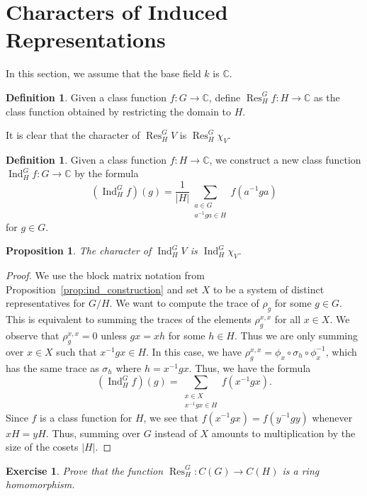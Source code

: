 \documentclass[12pt]{article}
\theoremstyle{plain}
\newtheorem{proposition}[theorem]{Proposition}
\newtheorem{exercise}[theorem]{Exercise}
\theoremstyle{definition}
\newtheorem{definition}[theorem]{Definition}
\theoremstyle{remark}
\numberwithin{equation}{section}
\begin{document}
\section{Characters of Induced Representations}

In this section, we assume that the base field $k$ is $\mathbb{C}$.

\begin{definition}
Given a class function $f : G \to \mathbb{C}$, define
$\operatorname{Res}_H^G f : H \to \mathbb{C}$ as the
class function obtained by restricting the domain to $H$.
\end{definition}

It is clear that the character of $\operatorname{Res}_H^G V$
is $\operatorname{Res}_H^G \chi_V$.

\begin{definition}
Given a class function $f : H \to \mathbb{C}$, we construct a new class
function $\operatorname{Ind}_H^G f : G \to \mathbb{C}$ by the formula
\[
(\operatorname{Ind}_H^G f)(g) =
\frac{1}{|H|}\sum_{\substack{a \in G\\a^{-1}ga \in H}} f(a^{-1}ga)
\]
for $g \in G$.
\end{definition}

\begin{proposition}
The character of $\operatorname{Ind}_H^G V$
is $\operatorname{Ind}_H^G \chi_V$.
\end{proposition}

\begin{proof}
We use the block matrix notation from
Proposition~\ref{prop:ind_construction}
and set $X$ to be a system of distinct representatives for $G/H$.
We want to compute the trace of $\rho_g$ for some $g \in G$.
This is equivalent to summing the traces of the elements
$\rho_g^{x,x}$ for all $x \in X$.
We observe that $\rho_g^{x,x} = 0$ unless $gx=xh$ for some
$h \in H$.
Thus we are only summing over $x \in X$ such that
$x^{-1}gx \in H$.  In this case, we have
$\rho_g^{x,x}=\phi_x \circ \sigma_h \circ \phi_x^{-1}$,
which has the same trace as $\sigma_h$ where $h=x^{-1}gx$.
Thus, we have the formula
\[
(\operatorname{Ind}_H^G f)(g) =
\sum_{\substack{x \in X\\x^{-1}gx \in H}} f(x^{-1}gx) .
\]
Since $f$ is a class function for $H$,
we see that $f(x^{-1}gx)=f(y^{-1}gy)$ whenever $xH=yH$.
Thus, summing over $G$ instead of $X$ amounts to
multiplication by the size of the cosets $|H|$.
\end{proof}

\begin{exercise}
Prove that the function
$\operatorname{Res}_H^G : C(G) \to C(H)$
is a ring homomorphism.
\end{exercise}
\end{document}
